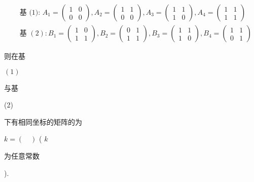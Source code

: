 \documentclass[10pt]{article}
\begin{document}
$$
\begin{aligned}
&\text { 基 (1): } A_{1}=\left(\begin{array}{ll}
1 & 0 \\
0 & 0
\end{array}\right), A_{2}=\left(\begin{array}{ll}
1 & 1 \\
0 & 0
\end{array}\right), A_{3}=\left(\begin{array}{ll}
1 & 1 \\
1 & 0
\end{array}\right), A_{4}=\left(\begin{array}{ll}
1 & 1 \\
1 & 1
\end{array}\right) \\
&\text { 基 }(2): B_{1}=\left(\begin{array}{ll}
1 & 0 \\
1 & 1
\end{array}\right), B_{2}=\left(\begin{array}{ll}
0 & 1 \\
1 & 1
\end{array}\right), B_{3}=\left(\begin{array}{ll}
1 & 1 \\
1 & 0
\end{array}\right), B_{4}=\left(\begin{array}{ll}
1 & 1 \\
0 & 1
\end{array}\right)
\end{aligned}
$$
\begin{CJK}{UTF8}{mj}则在基\end{CJK} $(1)$ \begin{CJK}{UTF8}{mj}与基\end{CJK} (2) \begin{CJK}{UTF8}{mj}下有相同坐标的矩阵的为\end{CJK} $k=(\quad)$ ( $k$ \begin{CJK}{UTF8}{mj}为任意常数\end{CJK}).
\end{document}

